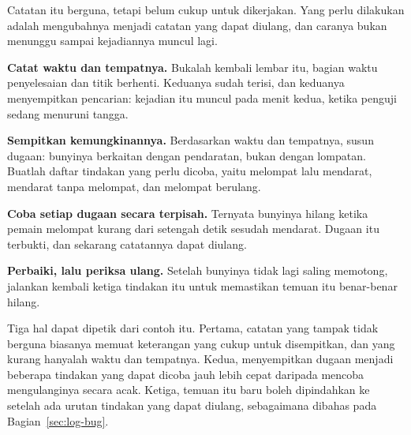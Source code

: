 Catatan itu berguna, tetapi belum cukup untuk dikerjakan. Yang perlu dilakukan
adalah mengubahnya menjadi catatan yang dapat diulang, dan caranya bukan
menunggu sampai kejadiannya muncul lagi.

\begin{langkah}
  \item \textbf{Catat waktu dan tempatnya.} Bukalah kembali lembar
         itu, bagian waktu penyelesaian dan titik berhenti.
        Keduanya sudah terisi, dan keduanya menyempitkan pencarian: kejadian
        itu muncul pada menit kedua, ketika penguji sedang menuruni tangga.
  \item \textbf{Sempitkan kemungkinannya.} Berdasarkan waktu dan tempatnya,
        susun dugaan: bunyinya berkaitan dengan pendaratan, bukan dengan
        lompatan. Buatlah daftar tindakan yang perlu dicoba, yaitu melompat
        lalu mendarat, mendarat tanpa melompat, dan melompat berulang.
  \item \textbf{Coba setiap dugaan secara terpisah.} Ternyata bunyinya hilang
        ketika pemain melompat kurang dari setengah detik sesudah mendarat.
        Dugaan itu terbukti, dan sekarang catatannya dapat diulang.
  \item \textbf{Perbaiki, lalu periksa ulang.} Setelah bunyinya tidak lagi
        saling memotong, jalankan kembali ketiga tindakan itu untuk memastikan
        temuan itu benar-benar hilang.
\end{langkah}

Tiga hal dapat dipetik dari contoh itu. Pertama, catatan yang tampak tidak
berguna biasanya memuat keterangan yang cukup untuk disempitkan, dan yang
kurang hanyalah waktu dan tempatnya. Kedua, menyempitkan dugaan menjadi
beberapa tindakan yang dapat dicoba jauh lebih cepat daripada mencoba
mengulanginya secara acak. Ketiga, temuan itu baru boleh dipindahkan ke
 setelah ada urutan tindakan yang dapat diulang, sebagaimana
dibahas pada Bagian~\ref{sec:log-bug}.
